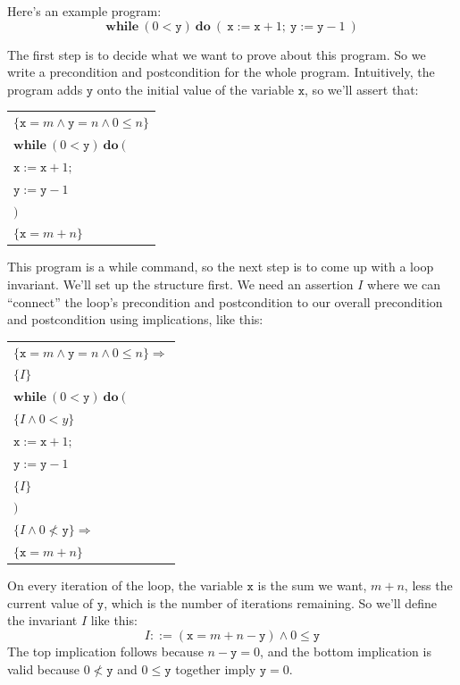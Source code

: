 Here's an example program:
\[
\mathbf{while}\ (0 < \mathtt{y})\ \mathbf{do}\ (
\ \mathtt{x} := \mathtt{x} + 1;\ \mathtt{y} := \mathtt{y} - 1
\ )
\]

The first step is to decide what we want to prove about this program. So we write a
precondition and postcondition for the whole program. Intuitively, the program adds
$\mathtt{y}$ onto the initial value of the variable $\mathtt{x}$, so we'll assert that:

\begin{center}
\begin{tabular}{l}
$\{\mathtt{x} = m \wedge \mathtt{y} = n \wedge 0 \leq n\}$ \\
$\mathbf{while}\ (0 < \mathtt{y})\ \mathbf{do}\ ($ \\
\qquad $\mathtt{x} := \mathtt{x} + 1;$ \\
\qquad $\mathtt{y} := \mathtt{y} - 1$ \\
$)$ \\
$\{\mathtt{x} = m + n\}$
\end{tabular}
\end{center}

This program is a while command, so the next step is to come up with a loop invariant. We'll
set up the structure first. We need an assertion $I$ where we can ``connect'' the loop's
precondition and postcondition to our overall precondition and postcondition using
implications, like this:

\begin{center}
\begin{tabular}{l}
$\{\mathtt{x} = m \wedge \mathtt{y} = n \wedge 0 \leq n\} \Rightarrow$ \\
$\{I\}$ \\
$\mathbf{while}\ (0 < \mathtt{y})\ \mathbf{do}\ ($ \\
\qquad $\{I \wedge 0 < y\}$ \\
\qquad $\mathtt{x} := \mathtt{x} + 1;$ \\
\qquad $\mathtt{y} := \mathtt{y} - 1$ \\
\qquad $\{I\}$ \\
$)$ \\
$\{I \wedge 0 \not< \mathtt{y}\} \Rightarrow$ \\
$\{\mathtt{x} = m + n\}$
\end{tabular}
\end{center}

On every iteration of the loop, the variable $\mathtt{x}$ is the sum we want, $m + n$, less the
current value of $\mathtt{y}$, which is the number of iterations remaining. So we'll define the
invariant $I$ like this:
\[
I ::= (\mathtt{x} = m + n - \mathtt{y}) \wedge 0 \leq \mathtt{y}
\]
The top implication follows because $n - \mathtt{y} = 0$, and the bottom implication is valid
because $0 \not< \mathtt{y}$ and $0 \leq \mathtt{y}$ together imply $\mathtt{y} = 0$.

